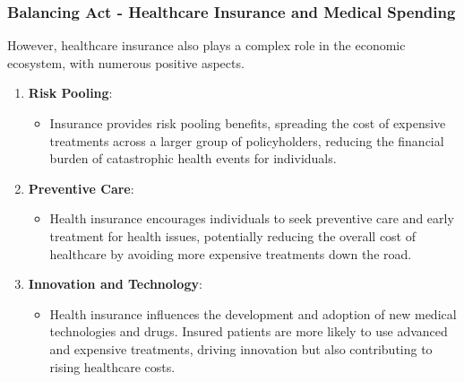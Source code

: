 \documentclass[notes,10pt, aspectratio=169]{beamer}
\begin{document}
\begin{frame}
\frametitle{Balancing Act - Healthcare Insurance and Medical Spending}
However, healthcare insurance also plays a complex role in the economic ecosystem, with numerous positive aspects.\vspace{1em}

\begin{enumerate}
  \item \textbf{Risk Pooling}:
    \begin{itemize}
      \item Insurance provides risk pooling benefits, spreading the cost of expensive treatments across a larger group of policyholders, reducing the financial burden of catastrophic health events for individuals.\vspace{1em}
    \end{itemize}

  \item \textbf{Preventive Care}:
    \begin{itemize}
      \item Health insurance encourages individuals to seek preventive care and early treatment for health issues, potentially reducing the overall cost of healthcare by avoiding more expensive treatments down the road.\vspace{1em}
    \end{itemize}

  \item \textbf{Innovation and Technology}:
    \begin{itemize}
      \item Health insurance influences the development and adoption of new medical technologies and drugs. Insured patients are more likely to use advanced and expensive treatments, driving innovation but also contributing to rising healthcare costs.\vspace{1em}
    \end{itemize}

\end{enumerate}
\end{frame}
\end{document}
